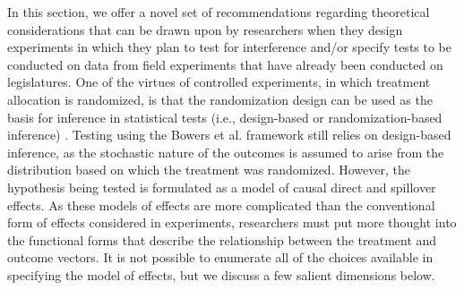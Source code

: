 \documentclass[12pt]{article}
\begin{document}
In this section, we offer a novel set of recommendations regarding theoretical considerations that can be drawn upon by researchers when they design experiments in which they plan to test for interference and/or specify tests to be conducted on data from field experiments that have already been conducted on legislatures. One of the virtues of controlled experiments, in which treatment allocation is randomized, is that the randomization design can be used as the basis for inference in statistical tests (i.e., design-based or randomization-based inference) \citep{little2000causal}. Testing using the Bowers et al. framework still relies on design-based inference, as the stochastic nature of the outcomes is assumed to arise from the distribution based on which the treatment was randomized. However, the hypothesis being tested is formulated as a model of causal direct and spillover effects. As these models of effects are more complicated than the conventional form of effects considered in experiments, researchers must put more thought into the functional forms that describe the relationship between the treatment and outcome vectors. It is not possible to enumerate all of the choices available in specifying the model of effects, but we discuss a few salient dimensions below. 
\end{document}
